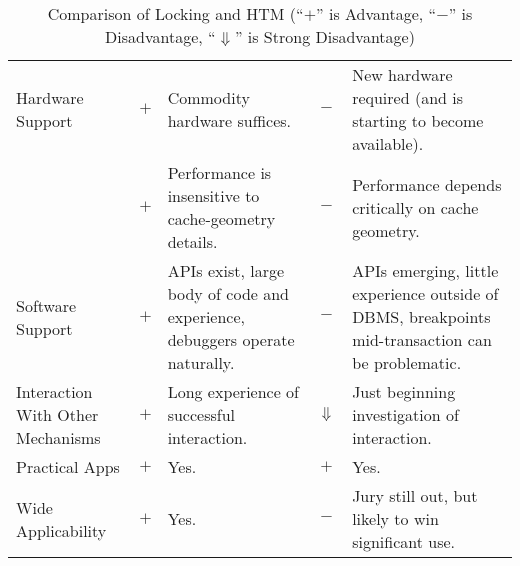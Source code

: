 \begin{table*}[p]
\begin{center}
\begin{tabular}{p{1.0in}||c|p{2.0in}||c|p{2.0in}}
\hline
Hardware Support
	& $+$
	& Commodity hardware suffices.
		& $-$
		& New hardware required (and is starting to become
		  available). \\
\cline{2-5}
	& $+$
	& Performance is insensitive to cache-geometry details.
		& $-$
		& Performance depends critically on cache geometry. \\
\hline
Software Support
	& $+$
	& APIs exist, large body of code and experience, debuggers operate
	  naturally.
		& $-$
		& APIs emerging, little experience outside of DBMS,
		  breakpoints mid-transaction can be problematic. \\
\hline
Interaction With Other Mechanisms
	& $+$
	& Long experience of successful interaction.
		& $\Downarrow$
		& Just beginning investigation of interaction. \\
\hline
Practical Apps
	& $+$
	& Yes.
		& $+$
		& Yes. \\
\hline
Wide Applicability
	& $+$
	& Yes.
		& $-$
		& Jury still out, but likely to win significant use. \\
\end{tabular}
\end{center}
\caption{Comparison of Locking and HTM (``$+$'' is Advantage, ``$-$'' is Disadvantage, ``$\Downarrow$'' is Strong Disadvantage)}
\label{tab:future:Comparison of Locking and HTM}
\end{table*}
